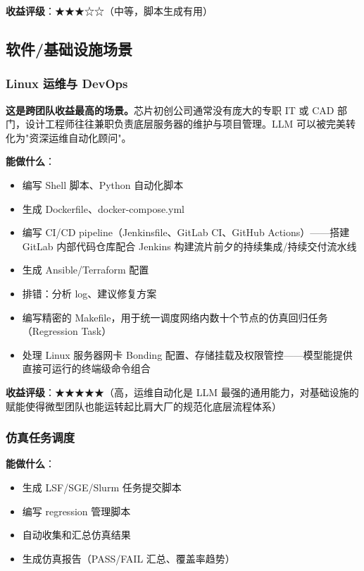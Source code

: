 \documentclass[UTF8,a4paper,10pt,oneside]{ctexart}
\begin{document}
\textbf{收益评级}：★★★☆☆（中等，脚本生成有用）

\subsection{软件/基础设施场景}

\subsubsection{Linux 运维与 DevOps}

\textbf{这是跨团队收益最高的场景。}芯片初创公司通常没有庞大的专职 IT 或 CAD 部门，设计工程师往往兼职负责底层服务器的维护与项目管理。LLM 可以被完美转化为"资深运维自动化顾问"。

\textbf{能做什么}：
\begin{itemize}
    \item 编写 Shell 脚本、Python 自动化脚本
    \item 生成 Dockerfile、docker-compose.yml
    \item 编写 CI/CD pipeline（Jenkinsfile、GitLab CI、GitHub Actions）——搭建 GitLab 内部代码仓库配合 Jenkins 构建流片前夕的持续集成/持续交付流水线
    \item 生成 Ansible/Terraform 配置
    \item 排错：分析 log、建议修复方案
    \item 编写精密的 Makefile，用于统一调度网络内数十个节点的仿真回归任务（Regression Task）
    \item 处理 Linux 服务器网卡 Bonding 配置、存储挂载及权限管控——模型能提供直接可运行的终端级命令组合
\end{itemize}

\textbf{收益评级}：★★★★★（高，运维自动化是 LLM 最强的通用能力，对基础设施的赋能使得微型团队也能运转起比肩大厂的规范化底层流程体系）

\subsubsection{仿真任务调度}

\textbf{能做什么}：
\begin{itemize}
    \item 生成 LSF/SGE/Slurm 任务提交脚本
    \item 编写 regression 管理脚本
    \item 自动收集和汇总仿真结果
    \item 生成仿真报告（PASS/FAIL 汇总、覆盖率趋势）
\end{itemize}
\end{document}
